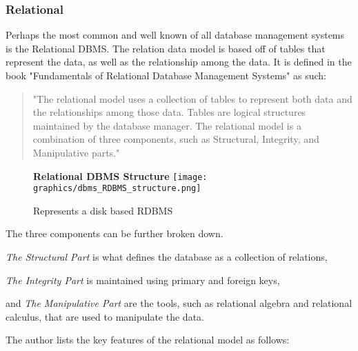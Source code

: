 \documentclass[letterpaper, 12pt]{article}
\begin{document}
\subsubsection{Relational}
Perhaps the most common and well known of all database management systems is the
Relational DBMS. The relation data model is based off of tables that represent
the data, as well as the relationship among the data. It is defined in the book
"Fundamentals of Relational Database Management Systems" as such:
\begin{quote}
"The relational model uses a collection of tables to represent both data and
the relationships among those data. Tables are logical structures maintained
by the database manager. The relational model is a combination of three
components, such as Structural, Integrity, and Manipulative parts."
\cite{sumathi2007fundamentals}
\end{quote}
\begin{figure}
  \centering
  \textbf{Relational DBMS Structure}
  \texttt{[image: graphics/dbms\_RDBMS\_structure.png]}
  \caption{Represents a disk based RDBMS}
\end{figure}
The three components can be further broken down.
\par\vspace{\baselineskip}
\textit{The Structural Part} is what defines the database as a collection of relations,
\par\vspace{\baselineskip}
\textit{The Integrity Part} is maintained using primary and foreign keys,
\par\vspace{\baselineskip}and
\textit{The Manipulative Part} are the tools, such as relational algebra and
relational calculus, that are used to manipulate the data.
\par\vspace{\baselineskip}
The author lists the key features of the relational model as follows:
\end{document}
